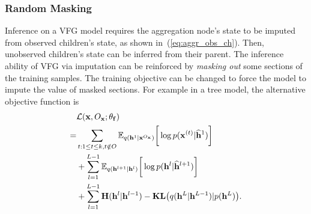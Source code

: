 \documentclass[twoside]{article}
\begin{document}
\subsubsection{Random Masking}
Inference on a VFG model requires the aggregation node's state to be imputed from observed children's state, as shown in~(\ref{eq:aggr_obs_ch}).
Then, unobserved children's state can be inferred from their parent.  
The inference ability of VFG via imputation can be reinforced by \emph{masking out} some sections of the training samples. 
The training objective can be changed to force the model to impute the value of masked sections. 
For example in a tree model, the alternative objective function is
\begin{align}  \notag
&\mathcal{L}(\mathbf{x}, O_{\mathbf{x}}; \theta_{\mathbf{f}})\\ \notag
= & \sum_{t: 1\leq t \leq k, t\notin O}
 \mathbb{E}_{q(\mathbf{h}^{1}|\mathbf{x}^{O_{\mathbf{x}}} )} \bigg[ \log p( \mathbf{x}^{(t)}|  \widehat{\mathbf{h}}^{1})   \bigg] \\ \label{eq:elbo_tree_mask}
 &+ \sum_{l=1}^{L-1}  \mathbb{E}_{q(\mathbf{h}^{l+1}|\mathbf{h}^l)} \bigg[ \log p( \mathbf{h}^{l}|  \widehat{\mathbf{h}}^{l+1})   \bigg]  \\  \notag
 & +  \sum_{l=1}^{L-1}   \textbf{\text{H}}(\mathbf{h}^l | \mathbf{h}^{l-1} )-   \textbf{\text{KL}}\big(q(\mathbf{h}^L | \mathbf{h}^{L-1} )   | p(\mathbf{h}^L)  \big).
\end{align}
\end{document}
